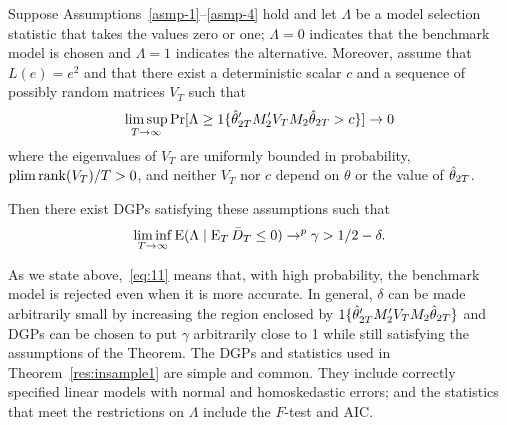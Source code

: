 \documentclass[12pt]{article}
\begin{document}
\begin{thm}\label{res:insample1}
  Suppose Assumptions~\ref{asmp-1}--\ref{asmp-4} hold and let
  $\Lambda$ be a model selection statistic that takes the values zero
  or one; $\Lambda = 0$ indicates that the benchmark model is chosen
  and $\Lambda = 1$ indicates the alternative.  Moreover, assume that
  $L(e) = e^2$ and that there exist a deterministic scalar $c$
  and a sequence of possibly random matrices $V_T$ such that
  \begin{equation}\label{eq:25}
    \limsup_{T \to \infty}
    \Pr[\Lambda \geq \operatorname{1}\{\hat\theta_{2T}'M_2' V_T M_2\hat\theta_{2T} > c \}]
    \to 0
  \end{equation}
  where the eigenvalues of $V_T$ are uniformly bounded in probability,
  $\operatorname*{plim} \operatorname*{rank}(V_T)/T > 0$, and neither $V_T$ nor $c$ depend on
  $\theta$ or the value of $\hat\theta_{2T}$.

  Then there exist DGPs satisfying these assumptions such that
  \begin{equation}\label{eq:11}
    \liminf_{T \to \infty} \operatorname{E}( \Lambda \mid \operatorname{E}_T \bar{D}_{T} \leq 0 )
    \to^p \gamma > 1/2 - \delta.
  \end{equation}
\end{thm}

As we state above,~\eqref{eq:11} means that, with high probability,
the benchmark model is rejected even when it is more accurate. In
general, $\delta$ can be made arbitrarily small by increasing the
region enclosed by $\operatorname{1}\{\hat\theta_{2T}'M_2' V_T M_2\hat\theta_{2T}\}$ and DGPs can be
chosen to put $\gamma$ arbitrarily close to 1 while still satisfying
the assumptions of the Theorem.  The DGPs and
statistics used in Theorem~\ref{res:insample1} are simple and
common. They include correctly specified linear models with normal and
homoskedastic errors; and the statistics that meet the restrictions on
$\Lambda$ include the $F$-test and AIC.
\end{document}
